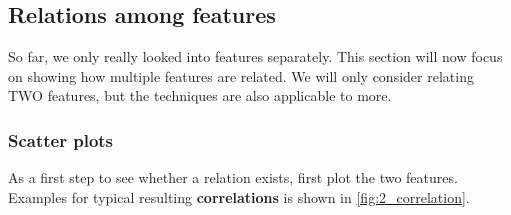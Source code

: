 \subsection{Relations among features}
So far, we only really looked into features separately. This section will now focus on showing how multiple features are related. We will only consider relating TWO features, but the techniques are also applicable to more.

\subsubsection*{Scatter plots}

As a first step to see whether a relation exists, first plot the two features. Examples for typical resulting \textbf{correlations} is shown in \ref{fig:2_correlation}.

